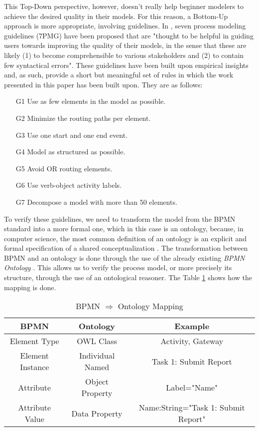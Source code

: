 \documentclass{llncs}
\begin{document}
This Top-Down perspective, however, doesn't really help beginner modelers to achieve the desired quality in their models. For this reason, a Bottom-Up approach is more appropriate, involving guidelines. In \cite{Mendling2010}, seven process modeling guidelines (7PMG) have been proposed that are "thought to be helpful in guiding users towards improving the quality of their models, in the sense that these are likely (1) to become comprehensible to various stakeholders and (2) to contain few syntactical errors". These guidelines have been built upon empirical insights and, as such, provide a short but meaningful set of rules in which the work presented in this paper has been built upon. They are as follows:
\begin{enumerate}
	\item[G1] Use as few elements in the model as possible.
	\item[G2] Minimize the routing paths per element.
	\item[G3] Use one start and one end event.
	\item[G4] Model as structured as possible. 
	\item[G5] Avoid OR routing elements.
	\item[G6] Use verb-object activity labels.
	\item[G7] Decompose a model with more than 50 elements.
\end{enumerate}

To verify these guidelines, we need to transform the model from the BPMN standard into a more formal one, which in this case is an ontology, because, in computer science, the most common definition of an ontology is an explicit and formal specification of a shared conceptualization \cite{borst1997ontology, Gruber1995907, Studer1998161}. The transformation between BPMN and an ontology is done through the use of the already existing \textit{BPMN Ontology} \cite{Rospocher2014foisbpmn}. This allows us to verify the process model, or more precisely its structure, through the use of an ontological reasoner. 
The Table \ref{BPMNOntologyMapping} shows how the mapping is done.

\begin{table}[h]
	\label{BPMNOntologyMapping}
	\caption{BPMN $\Rightarrow$ Ontology Mapping}
	\centering
	\begin{tabular}{ccc}
		\hline
		BPMN & Ontology & Example \\
		\hline
		Element Type & OWL Class & Activity, Gateway \\
		Element Instance & Individual Named & Task 1: Submit Report \\  
		Attribute & Object Property & Label="Name" \\
		Attribute Value & Data Property & Name:String="Task 1: Submit Report" \\ 
		\hline
	\end{tabular} 
\end{table}
\end{document}
